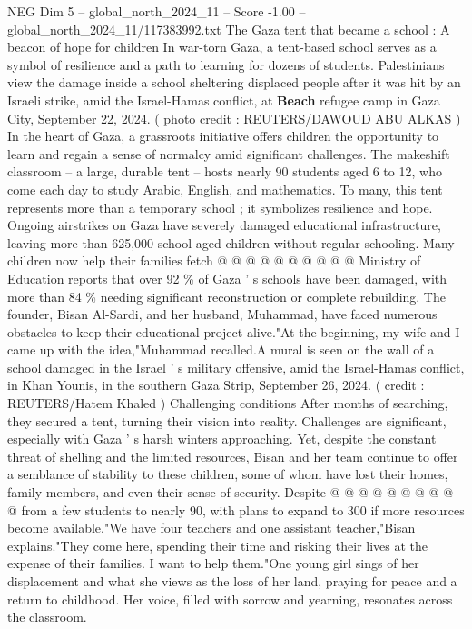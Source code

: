\begin{textsample}{NEG Dim 5 – global\_north\_2024\_11 – Score -1.00 – global\_north\_2024\_11/117383992.txt}  \label{ex:f5_neg_423}
The Gaza tent that became a school : A beacon of hope for children In war-torn Gaza, a tent-based school serves as a symbol of resilience and a path to learning for dozens of students.
Palestinians view the damage inside a school sheltering displaced people after it was hit by an Israeli strike, amid the Israel-Hamas conflict, at \textbf{Beach} refugee camp in Gaza City, September 22, 2024. ( photo credit : REUTERS/DAWOUD ABU ALKAS ) In the heart of Gaza, a grassroots initiative offers children the opportunity to learn and regain a sense of normalcy amid significant challenges.
The makeshift classroom -- a large, durable tent -- hosts nearly 90 students aged 6 to 12, who come each day to study Arabic, English, and mathematics.
To many, this tent represents more than a temporary school ; it symbolizes resilience and hope.
Ongoing airstrikes on Gaza have severely damaged educational infrastructure, leaving more than 625,000 school-aged children without regular schooling.
Many children now help their families fetch @ @ @ @ @ @ @ @ @ @ Ministry of Education reports that over 92 \% of Gaza ' s schools have been damaged, with more than 84 \% needing significant reconstruction or complete rebuilding.
The founder, Bisan Al-Sardi, and her husband, Muhammad, have faced numerous obstacles to keep their educational project alive."At the beginning, my wife and I came up with the idea,"Muhammad recalled.A mural is seen on the wall of a school damaged in the Israel ' s military offensive, amid the Israel-Hamas conflict, in Khan Younis, in the southern Gaza Strip, September 26, 2024. ( credit : REUTERS/Hatem Khaled ) Challenging conditions After months of searching, they secured a tent, turning their vision into reality.
Challenges are significant, especially with Gaza ' s harsh winters approaching.
Yet, despite the constant threat of shelling and the limited resources, Bisan and her team continue to offer a semblance of stability to these children, some of whom have lost their homes, family members, and even their sense of security.
Despite @ @ @ @ @ @ @ @ @ @ from a few students to nearly 90, with plans to expand to 300 if more resources become available."We have four teachers and one assistant teacher,"Bisan explains."They come here, spending their time and risking their lives at the expense of their families.
I want to help them."One young girl sings of her displacement and what she views as the loss of her land, praying for peace and a return to childhood.
Her voice, filled with sorrow and yearning, resonates across the classroom.

\end{textsample}
